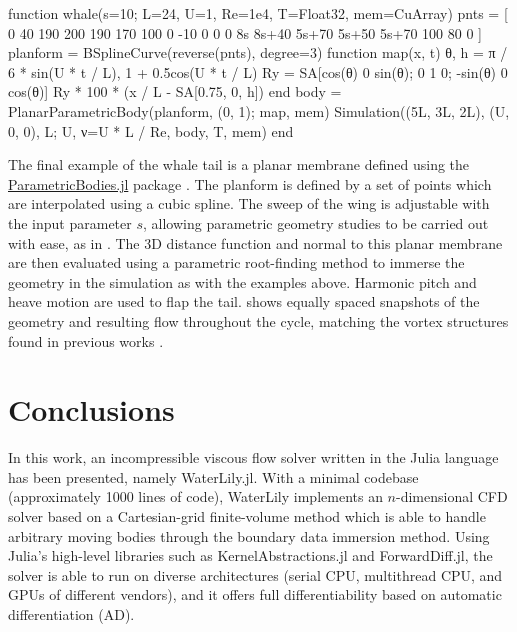 \documentclass[10pt,a4paper]{article}
\begin{document}
\begin{minipage}{\linewidth}
\begin{jllisting}
function whale(s=10; L=24, U=1, Re=1e4, T=Float32, mem=CuArray)
    pnts = [
        0 40 190   200   190   170   100   0 -10 0
        0  0  8s 8s+40 5s+70 5s+50 5s+70 100  80 0
    ]
    planform = BSplineCurve(reverse(pnts), degree=3)
    function map(x, t)
        θ, h = π / 6 * sin(U * t / L), 1 + 0.5cos(U * t / L)
        Ry = SA[cos(θ) 0 sin(θ); 0 1 0; -sin(θ) 0 cos(θ)]
        Ry * 100 * (x / L - SA[0.75, 0, h])
    end
    body = PlanarParametricBody(planform, (0, 1); map, mem)
    Simulation((5L, 3L, 2L), (U, 0, 0), L; U, ν=U * L / Re, body, T, mem)
end
\end{jllisting}
\end{minipage}

The final example of the whale tail is a planar membrane defined using the \href{https://github.com/WaterLily-jl/ParametricBodies.jl}{ParametricBodies.jl} package \citep{WeymouthLauber2023}. The planform is defined by a set of points which are interpolated using a cubic spline. The sweep of the wing is adjustable with the input parameter $s$, allowing parametric geometry studies to be carried out with ease, as in \cite{ZurmanNasution2021}. The 3D distance function and normal to this planar membrane are then evaluated using a parametric root-finding method to immerse the geometry in the simulation as with the examples above. Harmonic pitch and heave motion are used to flap the tail.  shows equally spaced snapshots of the geometry and resulting flow throughout the cycle, matching the vortex structures found in previous works \citep{ZurmanNasution2021}.

\section{Conclusions}\label{sec:conclusions}

In this work, an incompressible viscous flow solver written in the Julia language has been presented, namely WaterLily.jl. With a minimal codebase (approximately 1000 lines of code), WaterLily implements an $n$-dimensional CFD solver based on a Cartesian-grid finite-volume method which is able to handle arbitrary moving bodies through the boundary data immersion method. Using Julia's high-level libraries such as KernelAbstractions.jl and ForwardDiff.jl, the solver is able to run on diverse architectures (serial CPU, multithread CPU, and GPUs of different vendors), and it offers full differentiability based on automatic differentiation (AD).
\end{document}
